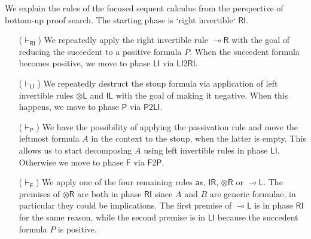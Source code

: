 \documentclass[copyright,creativecommons]{eptcs}
\theoremstyle{definition}
\newcommand{\tl}{\otimes \mathsf{L}}
\newcommand{\tr}{\otimes \mathsf{R}}
\newcommand{\lright}{{\multimap}\mathsf{R}}
\newcommand{\lleft}{{\multimap}\mathsf{L}}
\newcommand{\pass}{\mathsf{pass}}
\newcommand{\unitl}{\mathsf{IL}}
\newcommand{\unitr}{\mathsf{IR}}
\newcommand{\ax}{\mathsf{ax}}
\newcommand{\RI}{\mathsf{RI}}
\newcommand{\LI}{\mathsf{LI}}
\newcommand{\Pass}{\mathsf{P}}
\newcommand{\F}{\mathsf{F}}
\begin{document}
We explain the rules of the focused sequent calculus from the perspective of bottom-up proof search. The starting phase is `right invertible` $\RI$. %
\begin{itemize}
\item[($\vdash_\RI$)] We repeatedly apply the right invertible rule $\lright$ with the goal of reducing the succedent to a positive formula $P$.
  When the succedent formula becomes positive, we move to phase $\LI$ via $\LI2\RI$.
\item[($\vdash_\LI$)] We repeatedly destruct the stoup formula via application of left invertible rules $\tl$ and $\unitl$ with the goal of making it negative. When this happens, we move to phase $\Pass$ via $\Pass2\LI$.
\item[($\vdash_\Pass$)] We have the possibility of applying the passivation rule and move the leftmost formula $A$ in the context to the stoup, when the latter is empty. This allows us to start decomposing $A$ using left invertible rules in phase $\LI$. Otherwise we move to phase $\F$ via $\F2\Pass$.
\item[($\vdash_\F$)] We apply one of the four remaining rules $\ax$, $\unitr$, $\tr$ or $\lleft$. The premises of $\tr$ are both in phase $\RI$ since $A$ and $B$ are generic formulae, in particular they could be implications. The first premise of $\lleft$ is in phase $\RI$ for the same reason, while the second premise is in $\LI$ because the succedent formula $P$ is positive.
\end{itemize}
\end{document}
